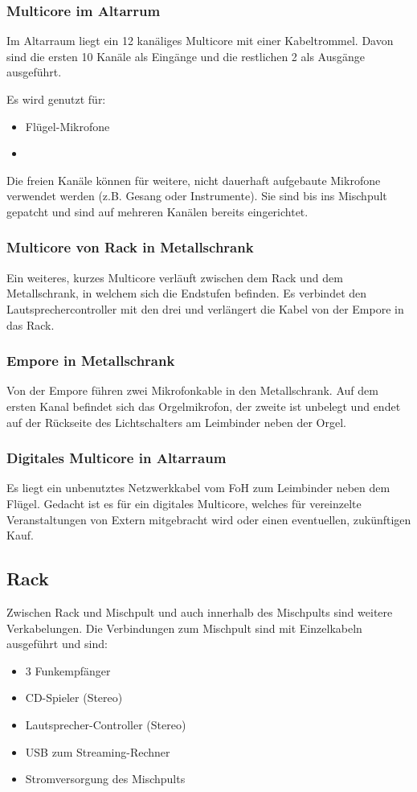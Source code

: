 			\subsubsection{Multicore im Altarrum}\label{ssec:kabel:ton:multicore_altarraum}
				Im Altarraum liegt ein 12 kanäliges Multicore mit einer Kabeltrommel.
				Davon sind die ersten 10 Kanäle als Eingänge und die restlichen 2 als Ausgänge ausgeführt.

				Es wird genutzt für:
				\begin{itemize}
					\item Flügel-Mikrofone
					\item {}
				\end{itemize}

				Die freien Kanäle können für weitere, nicht dauerhaft aufgebaute Mikrofone verwendet werden (z.B. Gesang oder Instrumente).
				Sie sind bis ins Mischpult gepatcht und sind auf mehreren Kanälen bereits eingerichtet.
			\subsubsection{Multicore von Rack in Metallschrank}
				Ein weiteres, kurzes Multicore verläuft zwischen dem Rack und dem Metallschrank, in welchem sich die Endstufen befinden.
				Es verbindet den \Gls{Lautsprechercontroller} mit den drei  und verlängert die Kabel von der Empore in das Rack.
			\subsubsection{Empore in Metallschrank}
				Von der Empore führen zwei Mikrofonkable in den Metallschrank.
				Auf dem ersten Kanal befindet sich das Orgelmikrofon, der zweite ist unbelegt und endet auf der Rückseite des Lichtschalters am Leimbinder neben der Orgel.
			\subsubsection{Digitales Multicore in Altarraum}\label{ssec:kabel:ton:digitales_multicore}
				Es liegt ein unbenutztes Netzwerkkabel vom \Gls{FoH} zum Leimbinder neben dem Flügel.
				Gedacht ist es für ein \Gls{digitales Multicore}, welches für vereinzelte Veranstaltungen von Extern mitgebracht wird oder einen eventuellen, zukünftigen Kauf.
		\subsection{Rack}
				Zwischen Rack und Mischpult und auch innerhalb des Mischpults sind weitere Verkabelungen.
				Die Verbindungen zum Mischpult sind mit Einzelkabeln ausgeführt und sind:
				\begin{itemize}
					\item 3 Funkempfänger
					\item CD-Spieler (Stereo)
					\item Lautsprecher-Controller (Stereo)
					\item USB zum Streaming-Rechner
					\item Stromversorgung des Mischpults
				\end{itemize}
